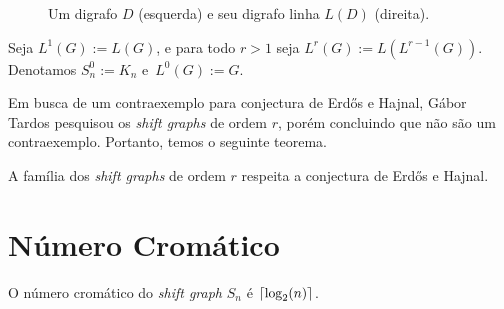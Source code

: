 \begin{figure}[H]
\centering
{}
\caption{Um digrafo $D$ (esquerda) e seu digrafo linha $L(D)$ (direita).}
\label{fig:shiftlinedigraph}
\end{figure}

Seja $L^1(G) := L(G)$, e para todo $r>1$ seja $L^r(G) := L(L^{r-1}(G))$. Denotamos $S_n^0 := K_n$ e~$L^0(G) := G$. 

Em busca de um contraexemplo para conjectura de Erd\H{o}s e Hajnal, Gábor Tardos pesquisou os \textit{shift graphs} de ordem $r$, porém concluindo que não são um contraexemplo. Portanto, temos o seguinte teorema.

\begin{teorema}\label{shiftteo}
A família dos \textit{shift graphs} de ordem $r$ respeita a conjectura de Erd\H{o}s e Hajnal. \cite{gabor2018cepa}
\end{teorema}

\section{Número Cromático}

\begin{afirmacao}\label{shiftchraff1}
O número cromático do \textit{shift graph} $S_n$ é $\lceil\log_2(n)\rceil$.
\end{afirmacao}

